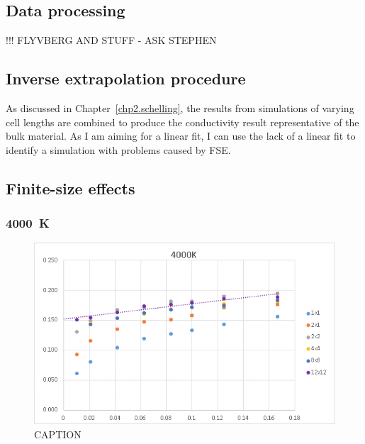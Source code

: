 \pagebreak

\subsection{\label{sec:3.DM.data}Data processing}

!!! FLYVBERG AND STUFF - ASK STEPHEN


\subsection{\label{sec:3.DM.extrap}Inverse extrapolation procedure}

As discussed in Chapter~\ref{chp2.schelling}, the results from simulations of varying cell lengths are combined to produce the conductivity result representative of the bulk material. As I am aiming for a linear fit, I can use the lack of a linear fit to identify a simulation with problems caused by FSE.
















\pagebreak

\subsection{\label{sec:3.DM.fse}Finite-size effects}

\subsubsection{4000~K}

\begin{figure}[h!]
\includegraphics[width=\linewidth]{Figures/direct_inv_4000.png}
\caption[direct inv 4000]{CAPTION}
\label{fig:direct_inv_4000}
\end{figure}

